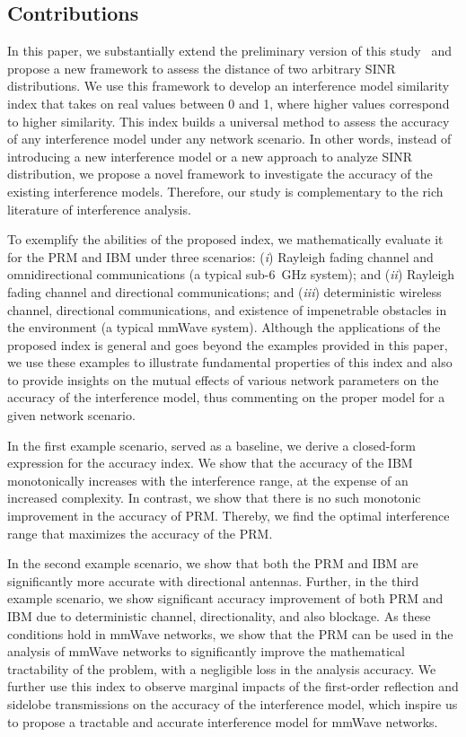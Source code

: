 \documentclass[12pt, draftclsnofoot, onecolumn]{IEEEtran}
\begin{document}
\subsection{Contributions}
In this paper, we substantially extend the preliminary version of this study~\cite{Shokri2016OntheAccuracy} and propose a new framework to assess the distance of two arbitrary SINR distributions. We use this framework to develop an interference model similarity index that takes on real values between 0 and 1, where higher values correspond to higher similarity. This index builds a universal method to assess the accuracy of any interference model under any network scenario. In other words, instead of introducing a new interference model or a new approach to analyze SINR distribution, we propose a novel framework to investigate the accuracy of the existing interference models. Therefore, our study is complementary to the rich literature of interference analysis.

To exemplify the abilities of the proposed index, we mathematically evaluate it for the PRM and IBM under three scenarios: (\textit{i}) Rayleigh fading channel and omnidirectional communications (a typical sub-6~GHz system); and (\textit{ii}) Rayleigh fading channel and directional communications; and (\textit{iii}) deterministic wireless channel, directional communications, and existence of impenetrable obstacles in the environment (a typical mmWave system). Although the applications of the proposed index is general and goes beyond the examples provided in this paper, we use these examples to illustrate fundamental properties of this index and also to provide insights on the mutual effects of various network parameters on the accuracy of the interference model, thus commenting on the proper model for a given network scenario.

In the first example scenario, served as a baseline, we derive a closed-form expression for the accuracy index. We show that the accuracy of the IBM monotonically increases with the interference range, at the expense of an increased complexity. In contrast, we show that there is no such monotonic improvement in the accuracy of PRM. Thereby, we find the optimal interference range that maximizes the accuracy of the PRM.

In the second example scenario, we show that both the PRM and IBM are significantly more accurate with directional antennas. Further, in the third example scenario, we show significant accuracy improvement of both PRM and IBM due to deterministic channel, directionality, and also blockage. As these conditions hold in mmWave networks, we show that the PRM can be used in the analysis of mmWave networks to significantly improve the mathematical tractability of the problem, with a negligible loss in the analysis accuracy. We further use this index to observe marginal impacts of the first-order reflection and sidelobe transmissions on the accuracy of the interference model, which inspire us to propose a tractable and accurate interference model for mmWave networks.
\end{document}
